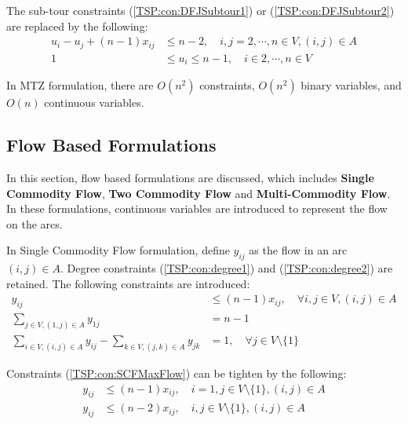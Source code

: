             The sub-tour constraints (\ref{TSP:con:DFJSubtour1}) or (\ref{TSP:con:DFJSubtour2}) are replaced by the following:
            \begin{align}
                u_i - u_j + (n - 1) x_{ij} &\le n - 2, \quad i, j = 2, \cdots, n \in V, (i, j) \in A \label{TSP:con:MTZ1}\\
                1 & \le u_i \le n - 1, \quad i \in 2, \cdots, n \in V \label{TSP:con:MTZ2}
            \end{align}

            In MTZ formulation, there are $O(n^2)$ constraints, $O(n^2)$ binary variables, and $O(n)$ continuous variables.

        \subsection{Flow Based Formulations}
            In this section, flow based formulations are discussed, which includes \textbf{Single Commodity Flow}, \textbf{Two Commodity Flow} and \textbf{Multi-Commodity Flow}. In these formulations, continuous variables are introduced to represent the flow on the arcs.

            In Single Commodity Flow formulation, define $y_{ij}$ as the flow in an arc $(i, j) \in A$. Degree constraints (\ref{TSP:con:degree1}) and (\ref{TSP:con:degree2}) are retained. The following constraints are introduced:
            \begin{align}
                y_{ij} & \le (n - 1) x_{ij}, \quad \forall i, j \in V, (i, j) \in A \label{TSP:con:SCFMaxFlow}\\
                \sum_{j \in V, (1, j) \in A} y_{1j} & = n - 1 \label{TSP:con:SCFInitFlow} \\
                \sum_{i \in V, (i, j) \in A} y_{ij} - \sum_{k \in V, (j, k) \in A} y_{jk} &= 1, \quad \forall j \in V \setminus \{1\} \label{TSP:con:SCFFlowBalance}
            \end{align}

            Constraints (\ref{TSP:con:SCFMaxFlow}) can be tighten by the following:
            \begin{align}
                y_{ij} &\le (n - 1) x_{ij}, \quad i = 1, j \in V \setminus \{1\}, (i, j) \in A \label{TSP:con:SCMMaxFlow1} \\
                y_{ij} &\le (n - 2) x_{ij}, \quad i, j \in V \setminus \{1\}, (i, j) \in A \label{TSP:con:SCMMaxFlow2}
            \end{align}

